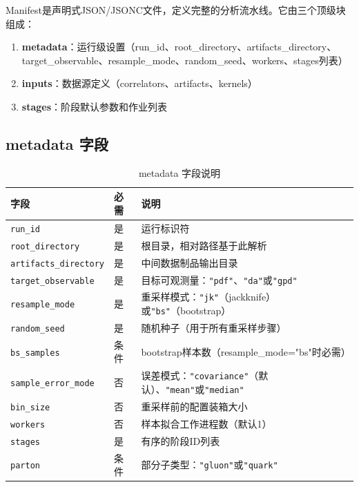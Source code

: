 \documentclass[12pt,a4paper]{ctexart}
\begin{document}
Manifest是声明式JSON/JSONC文件，定义完整的分析流水线。它由三个顶级块组成：

\begin{enumerate}[leftmargin=*]
    \item \textbf{metadata}：运行级设置（run\_id、root\_directory、artifacts\_directory、target\_observable、resample\_mode、random\_seed、workers、stages列表）
    \item \textbf{inputs}：数据源定义（correlators、artifacts、kernels）
    \item \textbf{stages}：阶段默认参数和作业列表
\end{enumerate}

\subsection{metadata 字段}

\begin{table}[H]
\centering
\caption{metadata 字段说明}
\label{tab:metadata}
\begin{tabular}{@{}llp{6cm}@{}}
\toprule
\textbf{字段} & \textbf{必需} & \textbf{说明} \\
\midrule
\texttt{run\_id} & 是 & 运行标识符 \\
\texttt{root\_directory} & 是 & 根目录，相对路径基于此解析 \\
\texttt{artifacts\_directory} & 是 & 中间数据制品输出目录 \\
\texttt{target\_observable} & 是 & 目标可观测量：\texttt{"pdf"}、\texttt{"da"}或\texttt{"gpd"} \\
\texttt{resample\_mode} & 是 & 重采样模式：\texttt{"jk"}（jackknife）或\texttt{"bs"}（bootstrap） \\
\texttt{random\_seed} & 是 & 随机种子（用于所有重采样步骤） \\
\texttt{bs\_samples} & 条件 & bootstrap样本数（resample\_mode="bs"时必需） \\
\texttt{sample\_error\_mode} & 否 & 误差模式：\texttt{"covariance"}（默认）、\texttt{"mean"}或\texttt{"median"} \\
\texttt{bin\_size} & 否 & 重采样前的配置装箱大小 \\
\texttt{workers} & 否 & 样本拟合工作进程数（默认1） \\
\texttt{stages} & 是 & 有序的阶段ID列表 \\
\texttt{parton} & 条件 & 部分子类型：\texttt{"gluon"}或\texttt{"quark"} \\
\bottomrule
\end{tabular}
\end{table}
\end{document}
